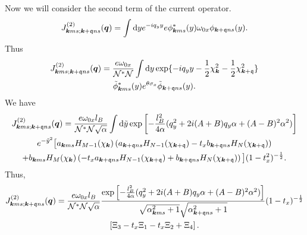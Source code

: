 Now we will consider the second term of the current operator.
\begin{equation}
  \label{eq:37}
  J_{\bm{k} m s; \bm{k} + \mathfrak{q} n s}^{(2)} (\bm{q}) =
  \int \mathrm{d} y
  e^{-iq_{y} y} e
  \phi ^{*}_{\bm{k} m s}(y) \omega _{0 x} \phi _{\bm{k} + \mathfrak{q} n s}(y).
\end{equation}
Thus
\begin{multline}
  \label{eq:38}
  J_{\bm{k} m s; \bm{k} + \mathfrak{q} n s}^{(2)} (\bm{q}) =
  \frac{e \omega _{0 x}}{\mathcal{N}^{*} \mathcal{N}}
  \int \mathrm{d} y
  \exp\{-i q_{y} y - \frac{1}{2} \chi_{\bm{k}} ^2 - \frac{1}{2} \chi _{\bm{k} + \mathfrak{q}}^2\} \\
  \tilde{\phi} ^{*}_{\bm{k} m s}(y) e^{\theta \sigma _{x}} \tilde{\phi} _{\bm{k} + \mathfrak{q} n s}(y).
\end{multline}
We have
\begin{multline}
  \label{eq:39}
  J_{\bm{k} m s; \bm{k} + \mathfrak{q} n s}^{(2)} (\bm{q}) =
  \frac{e \omega _{0 x} l_{B}}{\mathcal{N}^{*} \mathcal{N} \sqrt{\alpha}}
  \int \mathrm{d} \tilde{y}
    \exp \left[
      -\frac{l_{B}^2}{4 \alpha } (q_{y}^2 + 2i (A+B) q_{y} \alpha + (A-B)^2 \alpha^2)
    \right]\\
  e^{-\tilde{y}^2} \big[
    a_{\bm{k} m s} H_{M-1}( \chi _{\bm{k}} ) \left(a_{\bm{k} + \mathfrak{q} n s} H_{N-1}( \chi _{\bm{k} + \mathfrak{q}} ) - t_{x} b_{\bm{k} + \mathfrak{q} n s} H_{N}( \chi _{\bm{k} + \mathfrak{q}} ) \right)\\
   +
    b_{\bm{k} m s} H_{M}( \chi _{\bm{k}} ) \left(-t_{x} a_{\bm{k} + \mathfrak{q} n s} H_{N-1}( \chi _{\bm{k} + \mathfrak{q}} ) + b_{\bm{k} + \mathfrak{q} n s} H_{N}( \chi _{\bm{k} + \mathfrak{q}} ) \right)
    \big]
    (1 - t_{x}^2)^{-\frac{1}{2}}.
\end{multline}
Thus,
\begin{multline}
  J_{\bm{k} m s; \bm{k} + \mathfrak{q} n s}^{(2)} (\bm{q}) =
  \frac{e \omega _{0 x} l_{B}}{\mathcal{N}^{*} \mathcal{N} \sqrt{\alpha } }
  \frac{
    \exp \left[
      -\frac{l_{B}^2}{4 \alpha } (q_{y}^2 + 2i (A+B) q_{y} \alpha + (A-B)^2 \alpha^2)
    \right]
  }{
    \sqrt{\alpha_{\bm{k} m s}^2 + 1} \sqrt{\alpha _{\bm{k}+\mathfrak{q} n s}^2 + 1}
  }
  (1-t_{x})^{-\frac{1}{2}}\\
  \left[
    \Xi _{3} - t_{x} \Xi _{1}
    - t_{x} \Xi _{2} + \Xi_{4}
  \right].
\end{multline}


